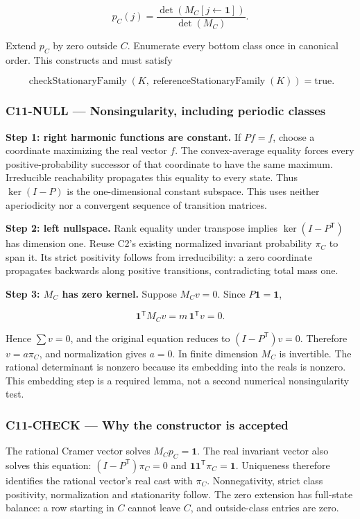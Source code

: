 \documentclass[
  11pt,
  a4paper,
]{article}
\newcommand{\codewrap}[1]{{\ttfamily\seqsplit{#1}}}
\begin{document}
\[p_C(j)=\frac{\det(M_C[j\leftarrow\mathbf1])}{\det(M_C)}.\]

Extend \(p_C\) by zero outside \(C\). Enumerate every bottom class once
in canonical order. This constructs
\codewrap{referenceStationaryFamily\ K} and must satisfy

\[\operatorname{checkStationaryFamily}
   (K,\operatorname{referenceStationaryFamily}(K))=\mathrm{true}.\]

\subsubsection{C11-NULL --- Nonsingularity, including periodic
classes}\label{c11-null-nonsingularity-including-periodic-classes}

\textbf{Step 1: right harmonic functions are constant.} If \(Pf=f\),
choose a coordinate maximizing the real vector \(f\). The convex-average
equality forces every positive-probability successor of that coordinate
to have the same maximum. Irreducible reachability propagates this
equality to every state. Thus \(\ker(I-P)\) is the one-dimensional
constant subspace. This uses neither aperiodicity nor a convergent
sequence of transition matrices.

\textbf{Step 2: left nullspace.} Rank equality under transpose implies
\(\ker(I-P^{\mathsf T})\) has dimension one. Reuse C2's existing
normalized invariant probability \(\pi_C\) to span it. Its strict
positivity follows from irreducibility: a zero coordinate propagates
backwards along positive transitions, contradicting total mass one.

\textbf{Step 3: \(M_C\) has zero kernel.} Suppose \(M_Cv=0\). Since
\(P\mathbf1=\mathbf1\),

\[\mathbf1^{\mathsf T}M_Cv=m\,\mathbf1^{\mathsf T}v=0.\]

Hence \(\sum v=0\), and the original equation reduces to
\((I-P^{\mathsf T})v=0\). Therefore \(v=a\pi_C\), and normalization
gives \(a=0\). In finite dimension \(M_C\) is invertible. The rational
determinant is nonzero because its embedding into the reals is nonzero.
This embedding step is a required lemma, not a second numerical
nonsingularity test.

\subsubsection{C11-CHECK --- Why the constructor is
accepted}\label{c11-check-why-the-constructor-is-accepted}

The rational Cramer vector solves \(M_Cp_C=\mathbf1\). The real
invariant vector also solves this equation: \((I-P^{\mathsf T})\pi_C=0\)
and \(\mathbf1\mathbf1^{\mathsf T}\pi_C=\mathbf1\). Uniqueness therefore
identifies the rational vector's real cast with \(\pi_C\).
Nonnegativity, strict class positivity, normalization and stationarity
follow. The zero extension has full-state balance: a row starting in
\(C\) cannot leave \(C\), and outside-class entries are zero.
\end{document}

